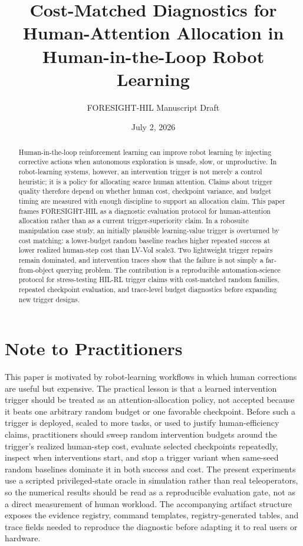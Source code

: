 \documentclass[11pt]{article}
\title{Cost-Matched Diagnostics for Human-Attention Allocation in Human-in-the-Loop Robot Learning}
\author{FORESIGHT-HIL Manuscript Draft}
\date{July 2, 2026}
\begin{document}
\maketitle

\begin{abstract}
Human-in-the-loop reinforcement learning can improve robot learning by injecting corrective actions when autonomous exploration is unsafe, slow, or unproductive. In robot-learning systems, however, an intervention trigger is not merely a control heuristic; it is a policy for allocating scarce human attention. Claims about trigger quality therefore depend on whether human cost, checkpoint variance, and budget timing are measured with enough discipline to support an allocation claim. This paper frames FORESIGHT-HIL as a diagnostic evaluation protocol for human-attention allocation rather than as a current trigger-superiority claim. In a robosuite manipulation case study, an initially plausible learning-value trigger is overturned by cost matching: a lower-budget random baseline reaches higher repeated success at lower realized human-step cost than LV-VoI scale3. Two lightweight trigger repairs remain dominated, and intervention traces show that the failure is not simply a far-from-object querying problem. The contribution is a reproducible automation-science protocol for stress-testing HIL-RL trigger claims with cost-matched random families, repeated checkpoint evaluation, and trace-level budget diagnostics before expanding new trigger designs.
\end{abstract}

\section*{Note to Practitioners}
This paper is motivated by robot-learning workflows in which human corrections are useful but expensive. The practical lesson is that a learned intervention trigger should be treated as an attention-allocation policy, not accepted because it beats one arbitrary random budget or one favorable checkpoint. Before such a trigger is deployed, scaled to more tasks, or used to justify human-efficiency claims, practitioners should sweep random intervention budgets around the trigger's realized human-step cost, evaluate selected checkpoints repeatedly, inspect when interventions start, and stop a trigger variant when same-seed random baselines dominate it in both success and cost. The present experiments use a scripted privileged-state oracle in simulation rather than real teleoperators, so the numerical results should be read as a reproducible evaluation gate, not as a direct measurement of human workload. The accompanying artifact structure exposes the evidence registry, command templates, registry-generated tables, and trace fields needed to reproduce the diagnostic before adapting it to real users or hardware.







\appendix

\clearpage

\end{document}
